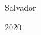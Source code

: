\begin{folharosto}

\begin{center}
\theauthor \\
\end{center}
\ \\
\ \\
\ \\
\ \\
\ \\
\begin{spacing}{2}
   \begin{center}
   {\LARGE {\bf \thetitle}}
   \end{center}
\end{spacing}
\ \\
\ \\
\ \\
\vspace*{85mm}







\ \\
\ \\
\ \\
\ \\
   \begin{center}
   Salvador \par
   \theuniversity \par
   2020
   \end{center}

\end{folharosto}
